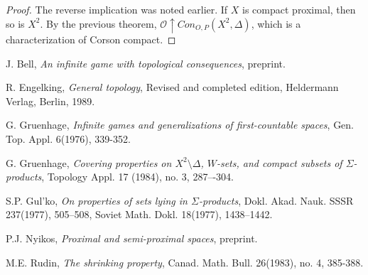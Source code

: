 \documentclass{amsart}
\theoremstyle{definition}
\theoremstyle{remark}
\newcommand{\<}{\langle}
\renewcommand{\>}{\rangle}
\newcommand{\congame}[2]{Con_{O,P}(#1,#2)}
\newcommand{\pl}[1]{\mathscr{#1}}
\newcommand{\win}{\uparrow}
\begin{document}
\begin{proof}
  The reverse implication was noted earlier. If $X$ is compact proximal, then so is $X^2$. By the previous theorem, $\pl O\win\congame{X^2}{\Delta}$, which is a characterization of Corson compact.
\end{proof}




\begin{thebibliography}{99}
 J. Bell,
  \emph{An infinite game with topological consequences}, preprint.

  R. Engelking,
  \emph{General topology}, Revised and completed edition, Heldermann Verlag, Berlin, 1989.




 G. Gruenhage,
  \emph{Infinite games and generalizations of first-countable spaces}, Gen. Top. Appl. 6(1976), 339-352.

  G. Gruenhage,
  \emph{Covering properties on $X^2\setminus\Delta$, $W$-sets, and compact subsets of $\Sigma$-products},
  Topology Appl. 17 (1984), no. 3, 287–-304.


 S.P. Gul'ko, \emph{On properties of sets lying in $\Sigma$-products}, Dokl. Akad. Nauk. SSSR 237(1977), 505--508, Soviet Math. Dokl. 18(1977), 1438--1442.


  P.J. Nyikos,
  \emph{Proximal and semi-proximal spaces}, preprint.

 M.E. Rudin, \emph{The shrinking property}, Canad. Math. Bull. 26(1983), no. 4, 385-388.

\end{thebibliography}
\end{document}
